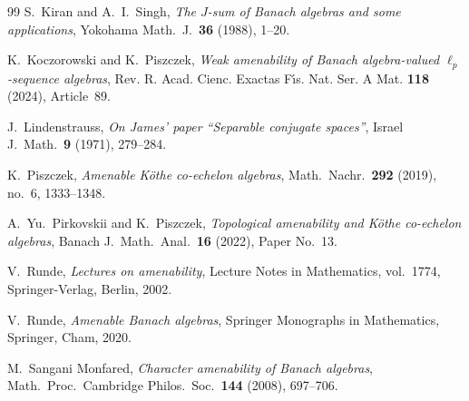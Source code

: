 \documentclass[reqno]{amsart}
\theoremstyle{plain}
\theoremstyle{definition}
\theoremstyle{remark}
\begin{document}
\begin{thebibliography}{99}
S.~Kiran and A.~I.~Singh,
\emph{The $J$-sum of Banach algebras and some applications},
Yokohama Math.\ J.\ \textbf{36} (1988), 1--20.



K.~Koczorowski and K.~Piszczek,
\emph{Weak amenability of Banach algebra-valued $\ell_p$-sequence algebras},
Rev. R. Acad. Cienc. Exactas F\'{\i}s. Nat. Ser. A Mat. \textbf{118} (2024), Article~89.

J.~Lindenstrauss,
\emph{On James' paper ``Separable conjugate spaces''},
Israel J.\ Math.\ \textbf{9} (1971), 279--284.

K.~Piszczek,
\emph{Amenable K\"othe co-echelon algebras},
Math.\ Nachr.\ \textbf{292} (2019), no.~6, 1333--1348.

A.~Yu.~Pirkovskii and K.~Piszczek,
\emph{Topological amenability and K\"othe co-echelon algebras},
Banach J.\ Math.\ Anal.\ \textbf{16} (2022), Paper No.~13.

V.~Runde,
\emph{Lectures on amenability},
Lecture Notes in Mathematics, vol.~1774,
Springer-Verlag, Berlin, 2002.

V.~Runde,
\emph{Amenable Banach algebras},
Springer Monographs in Mathematics,
Springer, Cham, 2020.

M.~Sangani Monfared,
\emph{Character amenability of Banach algebras},
Math.\ Proc.\ Cambridge Philos.\ Soc.\ \textbf{144} (2008), 697--706.

\end{thebibliography}
\end{document}
